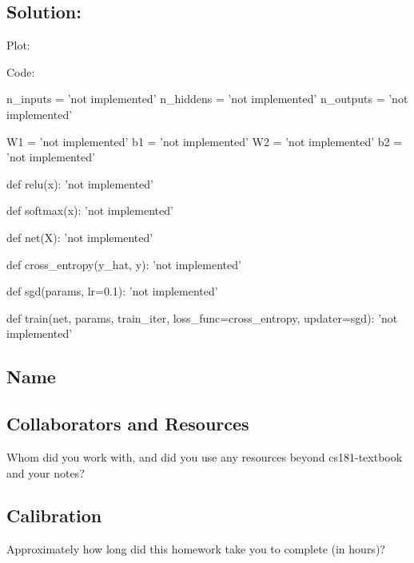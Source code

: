 \documentclass[submit]{harvardml}
\begin{document}
\subsection*{Solution:}
Plot:


Code:

\begin{python}
n_inputs = 'not implemented'
n_hiddens = 'not implemented'
n_outputs = 'not implemented'

W1 = 'not implemented'
b1 = 'not implemented'
W2 = 'not implemented'
b2 = 'not implemented'



def relu(x):
    'not implemented'



def softmax(x):
    'not implemented'



def net(X):
  'not implemented'



def cross_entropy(y_hat, y):
  'not implemented'



def sgd(params, lr=0.1):
  'not implemented'



def train(net, params, train_iter, loss_func=cross_entropy, updater=sgd):
  'not implemented'

\end{python}


\newpage
\subsection*{Name}

\subsection*{Collaborators and Resources}
Whom did you work with, and did you use any resources beyond cs181-textbook and your notes?

\subsection*{Calibration}
Approximately how long did this homework take you to complete (in hours)? 
\end{document}
